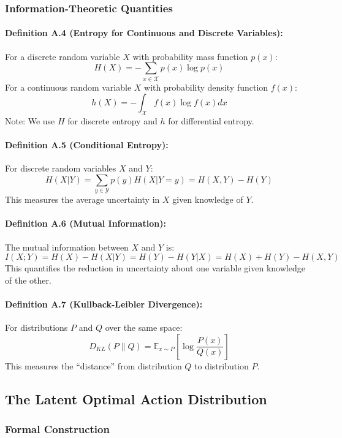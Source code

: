 \documentclass[10pt, letterpaper]{article}
\begin{document}
\subsubsection{Information-Theoretic Quantities}

\paragraph{Definition A.4 (Entropy for Continuous and Discrete Variables):} For a discrete random variable $X$ with probability mass function $p(x)$:
\[H(X) = -\sum_{x \in \mathcal{X}} p(x) \log p(x)\]
For a continuous random variable $X$ with probability density function $f(x)$:
\[h(X) = -\int_{\mathcal{X}} f(x) \log f(x) dx\]
Note: We use $H$ for discrete entropy and $h$ for differential entropy.

\paragraph{Definition A.5 (Conditional Entropy):} For discrete random variables $X$ and $Y$:
\[H(X|Y) = \sum_{y \in \mathcal{Y}} p(y) H(X|Y=y) = H(X,Y) - H(Y)\]
This measures the average uncertainty in $X$ given knowledge of $Y$.

\paragraph{Definition A.6 (Mutual Information):} The mutual information between $X$ and $Y$ is:
\[I(X;Y) = H(X) - H(X|Y) = H(Y) - H(Y|X) = H(X) + H(Y) - H(X,Y)\]
This quantifies the reduction in uncertainty about one variable given knowledge of the other.

\paragraph{Definition A.7 (Kullback-Leibler Divergence):} For distributions $P$ and $Q$ over the same space:
\[D_{KL}(P \| Q) = \mathbb{E}_{x \sim P} \left[ \log \frac{P(x)}{Q(x)} \right]\]
This measures the ``distance'' from distribution $Q$ to distribution $P$.

\subsection{The Latent Optimal Action Distribution}

\subsubsection{Formal Construction}
\end{document}
